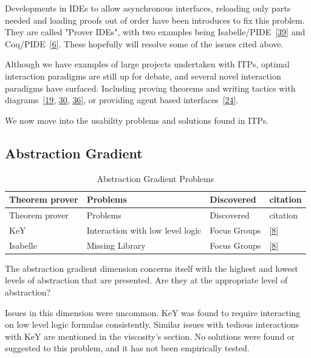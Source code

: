 \documentclass[
]{article}
\begin{document}
Developments in IDEs to allow asynchronous interfaces, reloading only
parts needed and loading proofs out of order have been introduces to fix
this problem. They are called "Prover IDEs", with two examples being
Isabelle/PIDE~{[}\protect\hyperlink{ref-wenzel_asynchronous_2014}{39}{]}
and Coq/PIDE~{[}\protect\hyperlink{ref-barras_asynchronous_2015}{6}{]}.
These hopefully will resolve some of the issues cited above.

Although we have examples of large projects undertaken with ITPs,
optimal interaction paradigms are still up for debate, and several novel
interaction paradigms have surfaced. Including proving theorems and
writing tactics with
diagrams~{[}\protect\hyperlink{ref-grov_tinker_2018}{19},
\protect\hyperlink{ref-lin_understanding_2016}{30},
\protect\hyperlink{ref-shams_accessible_2018}{36}{]}, or providing agent
based
interfaces~{[}\protect\hyperlink{ref-hunter_agent-based_2005}{24}{]}.

We now move into the usability problems and solutions found in ITPs.

\hypertarget{abstraction-gradient-1}{%
\subsection{Abstraction Gradient}\label{abstraction-gradient-1}}

\hypertarget{tbl:abstraction_gradient}{}
\begin{longtable}[]{@{}llll@{}}
\caption{\label{tbl:abstraction_gradient}Abstraction Gradient
Problems}\tabularnewline
\toprule
Theorem prover & Problems & Discovered & citation \\
\midrule
\endfirsthead
\toprule
Theorem prover & Problems & Discovered & citation \\
\midrule
\endhead
KeY & Interaction with low level logic & Focus Groups &
{[}\protect\hyperlink{ref-beckert_usability_2015}{8}{]} \\
Isabelle & Missing Library & Focus Groups &
{[}\protect\hyperlink{ref-beckert_usability_2015}{8}{]} \\
\bottomrule
\end{longtable}

The abstraction gradient dimension concerns itself with the highest and
lowest levels of abstraction that are presented. Are they at the
appropriate level of abstraction?

Issues in this dimension were uncommon. KeY was found to require
interacting on low level logic formulas consistently. Similar issues
with tedious interactions with KeY are mentioned in the viscosity's
section. No solutions were found or suggested to this problem, and it
has not been empirically tested.
\end{document}
